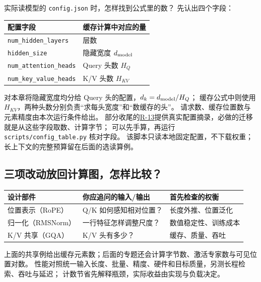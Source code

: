 

实际读模型的 \texttt{config.json} 时，怎样找到公式里的数？
先认出四个字段：
\begin{center}\small
{}
\begin{tabular}{@{}ll@{}}\toprule
配置字段 & 缓存计算中对应的量\\\midrule
\texttt{num\_hidden\_layers} & 层数\\
\texttt{hidden\_size} & 隐藏宽度 $d_{\rm model}$\\
\texttt{num\_attention\_heads} & Query 头数 $H_Q$\\
\texttt{num\_key\_value\_heads} & K/V 头数 $H_{KV}$\\\bottomrule
\end{tabular}
\end{center}
对本章将隐藏宽度均分给 Query 头的配置，$d_k=d_{\rm model}/H_Q$；
缓存公式中则使用 $H_{KV}$，两种头数分别负责“求每头宽度”和“数缓存的头”。
请求数、缓存位置数与元素精度由本次运行条件给出。
部分收尾的\hyperref[exercise:R-13]{R-13}提供真实配置摘录，必做的迁移就是从这些字段取数、计算字节；
可以先手算，再运行 \texttt{scripts/config\_table.py} 核对字段。
该脚本只读本地固定配置，不下载权重；长上下文的完整预算留在后面的选读算例。

\subsection{三项改动放回计算图，怎样比较？}
\label{sec:modern-core-comparison}

\begin{center}
\small
\renewcommand{\arraystretch}{1.3}
\begin{tabularx}{\linewidth}{@{}>{\raggedright\arraybackslash}p{30mm}>{\raggedright\arraybackslash}p{45mm}>{\raggedright\arraybackslash}X@{}}
\toprule
设计部件 & 你应追问的输入/输出 & 首先检查的权衡\\
\midrule
位置表示（RoPE） & Q/K 如何感知相对位置？ & 长度外推、位置泛化\\
归一化（RMSNorm） & 一行特征怎样调整尺度？ & 数值稳定性、训练成本\\
K/V 共享（GQA） & K/V 头有多少？ & 缓存、质量、吞吐\\
\bottomrule
\end{tabularx}
\end{center}

\begin{boundarybox}[title={适用条件：结构计数与实际性能}]
上面的共享例给出缓存元素数；后面的专题还会计算字节数、激活专家数与可见位置对数。
性能对照统一输入长度、批量、精度、硬件和目标质量，另测长程检索、吞吐与延迟；
计数节省先解释瓶颈，实际收益由实现与负载决定。
\end{boundarybox}

